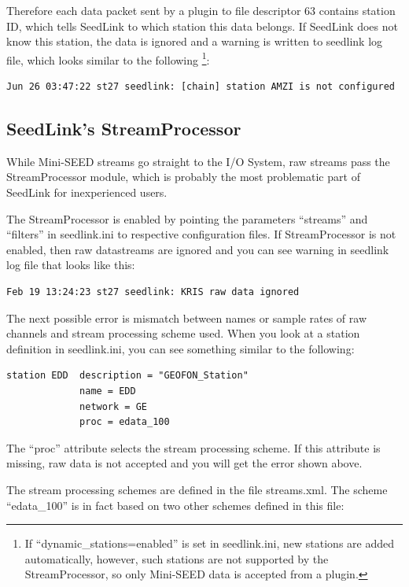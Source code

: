 \documentclass[11pt,a4paper,titlepage]{article}
\begin{document}
Therefore each data packet sent by a plugin to file descriptor 63 contains
station ID, which tells SeedLink to which station this data belongs. If
SeedLink does not know this station, the data is ignored and a warning is
written to seedlink log file, which looks similar to the following%
\footnote{If ``dynamic\_stations=enabled'' is set in seedlink.ini, new
stations are added automatically, however, such stations are not supported
by the StreamProcessor, so only Mini-SEED data is accepted from a plugin.}:

\begin{verbatim}
Jun 26 03:47:22 st27 seedlink: [chain] station AMZI is not configured
\end{verbatim}


\subsection{SeedLink's StreamProcessor}

While Mini-SEED streams go straight to the I/O System, raw streams pass the
StreamProcessor module, which is probably the most problematic part of
SeedLink for inexperienced users.

The StreamProcessor is enabled by pointing the parameters ``streams'' and
``filters'' in seedlink.ini to respective configuration files. If
StreamProcessor is not enabled, then raw datastreams are ignored and you
can see warning in seedlink log file that looks like this:

\begin{verbatim}
Feb 19 13:24:23 st27 seedlink: KRIS raw data ignored
\end{verbatim}

The next possible error is mismatch between names or sample rates of raw
channels and stream processing scheme used. When you look at a station
definition in seedlink.ini, you can see something similar to the following:

\begin{verbatim}
station EDD  description = "GEOFON_Station"
             name = EDD
             network = GE
             proc = edata_100
\end{verbatim}

The ``proc'' attribute selects the stream processing scheme. If this
attribute is missing, raw data is not accepted and you will get the error
shown above.

The stream processing schemes are defined in the file streams.xml. The
scheme ``edata\_100'' is in fact based on two other schemes defined in this
file:
\end{document}
